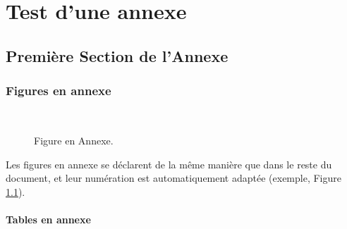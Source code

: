 \documentclass[letterpaper
, twoside
, 12pt
,these
,francais
,creativecommons,hyperref
]{thETS}
\begin{document}
\begin{conclusion}

\lipsum[1] %

\end{conclusion}


\appendix

\multiannexe

% 

\chapter{Test d'une annexe}


\section{Première Section de l'Annexe}


\subsection{Figures en annexe}

\begin{figure}
	\centering
	 \\ \parbox{0.75\textwidth}{\caption{Figure en Annexe.}\label{fig:testAp}}
\end{figure}

Les figures en annexe se déclarent de la même manière que dans le reste du document, et leur numération est automatiquement adaptée (exemple, Figure \ref{fig:testAp}).

\subsubsection{Tables en annexe}
\end{document}
